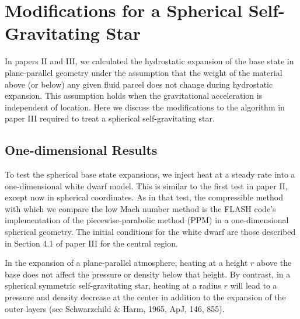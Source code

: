 
\section{\label{app:gravity} Modifications for a Spherical Self-Gravitating Star}

In papers II and III, we calculated the hydrostatic expansion of the base state
in plane-parallel geometry under the assumption that the weight of the
material above (or below) any given fluid parcel does not change
during hydrostatic expansion.  This assumption holds when the
gravitational acceleration is independent of location.  Here we discuss the
modifications to the algorithm in paper III required to treat a spherical 
self-gravitating star.

\subsection{One-dimensional Results}

To test the spherical base state expansions, we inject heat at a
steady rate into a one-dimensional white dwarf model.  This is similar
to the first test in paper II, except now in spherical coordinates.
As in that test, the compressible method with which we compare the low Mach number method 
is the FLASH code's implementation of the
piecewise-parabolic method (PPM) in a one-dimensional spherical geometry.  
The initial conditions for the white dwarf are those described in
Section 4.1 of paper III for the central region.


In the expansion of a plane-parallel atmosphere, heating at a
height $r$ above the base does not affect the pressure or density 
below that height.  By contrast, in a spherical symmetric
self-gravitating star, heating at a radius $r$ will lead to a pressure
and density decrease at the center in addition to the expansion of the
outer layers (see Schwarzchild \& Harm, 1965, ApJ, 146, 855).


